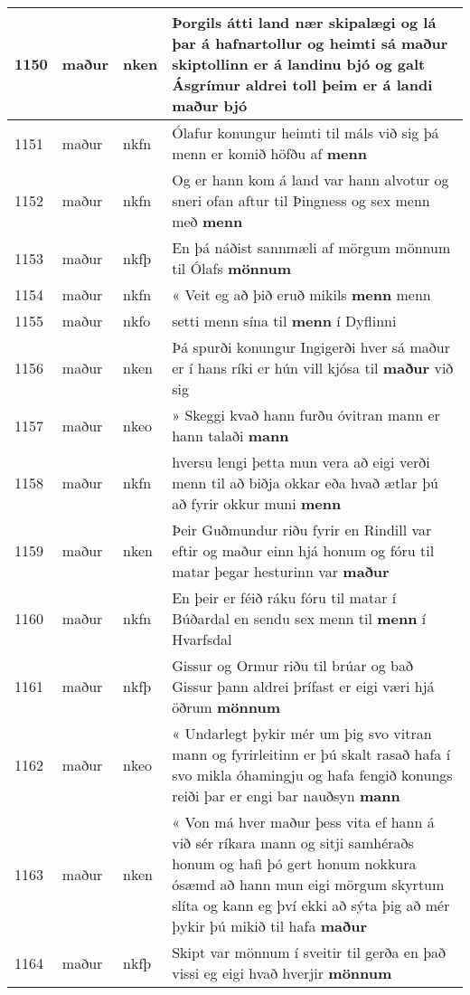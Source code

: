 \documentclass{article}
\begin{document}
\begin{longtable}{p{1cm}|p{1cm}|p{1cm}|p{13cm}}
\hline
1150&maður&nken&Þorgils átti land nær skipalægi og lá þar á hafnartollur og heimti sá maður skiptollinn er á landinu bjó og galt Ásgrímur aldrei toll þeim er á landi \textbf{maður} bjó\\
\hline
1151&maður&nkfn&Ólafur konungur heimti til máls við sig þá menn er komið höfðu af \textbf{menn} \\
\hline
1152&maður&nkfn&Og er hann kom á land var hann alvotur og sneri ofan aftur til Þingness og sex menn með \textbf{menn} \\
\hline
1153&maður&nkfþ&En þá náðist sannmæli af mörgum mönnum til Ólafs \textbf{mönnum} \\
\hline
1154&maður&nkfn&« Veit eg að þið eruð mikils \textbf{menn} menn\\
\hline
1155&maður&nkfo&setti menn sína til \textbf{menn} í Dyflinni\\
\hline
1156&maður&nken&Þá spurði konungur Ingigerði hver sá maður er í hans ríki er hún vill kjósa til \textbf{maður} við sig\\
\hline
1157&maður&nkeo&» Skeggi kvað hann furðu óvitran mann er hann talaði \textbf{mann} \\
\hline
1158&maður&nkfn&hversu lengi þetta mun vera að eigi verði menn til að biðja okkar eða hvað ætlar þú að fyrir okkur muni \textbf{menn} \\
\hline
1159&maður&nken&Þeir Guðmundur riðu fyrir en Rindill var eftir og maður einn hjá honum og fóru til matar þegar hesturinn var \textbf{maður} \\
\hline
1160&maður&nkfn&En þeir er féið ráku fóru til matar í Búðardal en sendu sex menn til \textbf{menn} í Hvarfsdal\\
\hline
1161&maður&nkfþ&Gissur og Ormur riðu til brúar og bað Gissur þann aldrei þrífast er eigi væri hjá öðrum \textbf{mönnum} \\
\hline
1162&maður&nkeo&« Undarlegt þykir mér um þig svo vitran mann og fyrirleitinn er þú skalt rasað hafa í svo mikla óhamingju og hafa fengið konungs reiði þar er engi bar nauðsyn \textbf{mann} \\
\hline
1163&maður&nken&« Von má hver maður þess vita ef hann á við sér ríkara mann og sitji samhéraðs honum og hafi þó gert honum nokkura ósæmd að hann mun eigi mörgum skyrtum slíta og kann eg því ekki að sýta þig að mér þykir þú mikið til hafa \textbf{maður} \\
\hline
1164&maður&nkfþ&Skipt var mönnum í sveitir til gerða en það vissi eg eigi hvað hverjir \textbf{mönnum} \\

\end{longtable}
\end{document}
